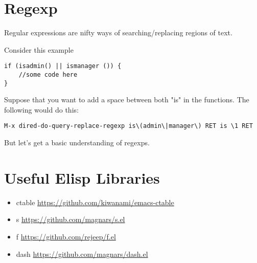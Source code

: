 \documentclass[11pt]{article}
\begin{document}
\section{Regexp}
\label{sec:orgheadline32}
Regular expressions are nifty ways of searching/replacing regions of text.

Consider this example

\begin{verbatim}
if (isadmin() || ismanager ()) {
    //some code here
}
\end{verbatim}

Suppose that you want to add a space between both "is" in the functions.  The following would do this:

\texttt{M-x dired-do-query-replace-regexp is\textbackslash{}(admin\textbackslash{}|manager\textbackslash{}) RET is \textbackslash{}1 RET}

But let's get a basic understanding of regexps.

\section{Useful Elisp Libraries}
\label{sec:orgheadline33}
\begin{itemize}
\item ctable \url{https://github.com/kiwanami/emacs-ctable}
\item s \url{https://github.com/magnars/s.el}
\item f \url{https://github.com/rejeep/f.el}
\item dash \url{https://github.com/magnars/dash.el}
\end{itemize}
\end{document}
